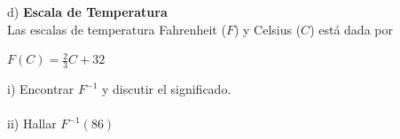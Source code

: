 \documentclass[11pt, a4paper]{article}
\begin{document}
\newpage 
d) \textbf{Escala de Temperatura} \\ 
Las escalas de temperatura Fahrenheit ($F$) y Celsius ($C$) est\'a dada por 
\begin{center}
    $\displaystyle F(C) = \frac{2}{3}C + 32 $
\end{center}
i) Encontrar $F^{-1}$ y discutir el significado. \\ \\
ii) Hallar $F^{-1}(86)$


 
\end{document}
